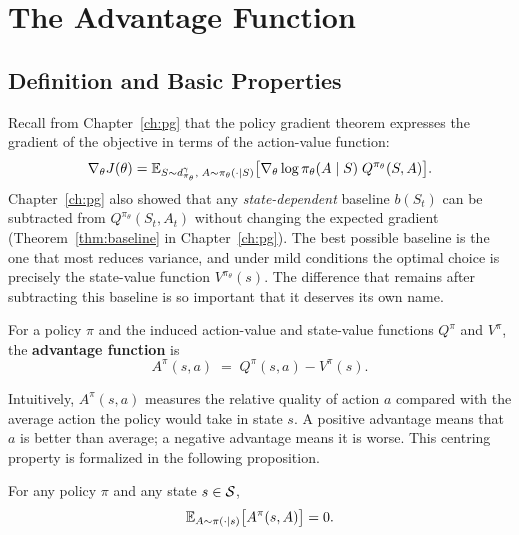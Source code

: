 \section{The Advantage Function}
\label{sec:advantage}

\subsection{Definition and Basic Properties}

Recall from Chapter~\ref{ch:pg} that the policy gradient theorem
expresses the gradient of the objective in terms of the action-value function:
\begin{equation}
\label{eq:pg-theorem-repeat}
\nabla_\theta J(\theta)
= \operatorname{\mathbb{E}}_{S \sim d^\gamma_{\pi_\theta},\; A \sim \pi_\theta(\cdot|S)}
  \bigl[\nabla_\theta \log \pi_\theta(A \mid S)\; Q^{\pi_\theta}(S, A)\bigr].
\end{equation}
Chapter~\ref{ch:pg} also showed that any \emph{state-dependent} baseline
$b(S_t)$ can be subtracted from $Q^{\pi_\theta}(S_t, A_t)$ without
changing the expected gradient (Theorem~\ref{thm:baseline} in Chapter~\ref{ch:pg}).
The best possible baseline is the one that most reduces variance, and
under mild conditions the optimal choice is precisely the state-value function
$V^{\pi_\theta}(s)$.  The difference that remains after subtracting this
baseline is so important that it deserves its own name.

\begin{definition}
\label{def:advantage-ch9}
For a policy $\pi$ and the induced action-value and state-value functions
$Q^\pi$ and $V^\pi$, the \textbf{advantage function} is
\begin{equation}
\label{eq:advantage-def}
A^\pi(s, a) \;=\; Q^\pi(s, a) - V^\pi(s).
\end{equation}
\end{definition}

Intuitively, $A^\pi(s,a)$ measures the relative quality of action $a$ compared
with the average action the policy would take in state $s$.  A positive
advantage means that $a$ is better than average; a negative advantage means
it is worse.  This centring property is formalized in the following proposition.

\begin{proposition}
\label{prop:advantage-zero-mean}
For any policy $\pi$ and any state $s \in \mathcal{S}$,
\begin{equation}
\label{eq:advantage-zero-mean}
\operatorname{\mathbb{E}}_{A \sim \pi(\cdot|s)}\bigl[A^\pi(s, A)\bigr] = 0.
\end{equation}
\end{proposition}

